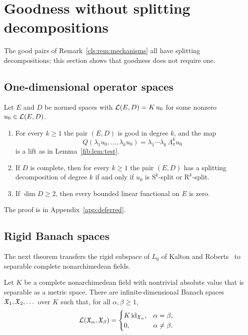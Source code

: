 \section{Goodness without splitting decompositions}\label{sec:beyond}
The good pairs of Remark~\ref{cls:rem:mechanisms} all have splitting decompositions; this section shows that goodness
does not require one.

\subsection{One-dimensional operator spaces}

\begin{proposition}\label{bey:prop:one-dim}
Let $E$ and $D$ be normed spaces with $\mathcal L(E,D)=K\,u_0$ for some nonzero $u_0\in\mathcal L(E,D)$.
\begin{enumerate}
\item For every $k\ge1$ the pair $(E,D)$ is good in degree $k$, and the map
\[
Q(\lambda_1u_0,\dots,\lambda_ku_0)=\lambda_1\cdots\lambda_k\,\Lambda^k_\pi u_0
\]
is a lift as in Lemma~\ref{fib:lem:test}.
\item If $D$ is complete, then for every $k\ge1$ the pair $(E,D)$ has a splitting decomposition of degree $k$ if and
only if $u_0$ is $\mathrm S^k$-split or $\mathrm R^k$-split.
\item If $\dim D\ge2$, then every bounded linear functional on $E$ is zero.
\end{enumerate}
\end{proposition}

The proof is in Appendix~\ref{app:deferred}.

\subsection{Rigid Banach spaces}

The next theorem transfers the rigid subspace of $L_0$ of Kalton and Roberts~\cite{KR} to separable complete
nonarchimedean fields.

\begin{theorem}\label{bey:thm:rigid}
Let $K$ be a complete nonarchimedean field with nontrivial absolute value that is separable as a metric space. There
are infinite-dimensional Banach spaces $\mathfrak X_1,\mathfrak X_2,\dots$ over $K$ such that, for all $\alpha,\beta\ge1$,
\[
\mathcal L(\mathfrak X_\alpha,\mathfrak X_\beta)=
\begin{cases}
K\,\mathrm{id}_{\mathfrak X_\alpha},&\alpha=\beta,\\
0,&\alpha\ne\beta.
\end{cases}
\]
\end{theorem}

